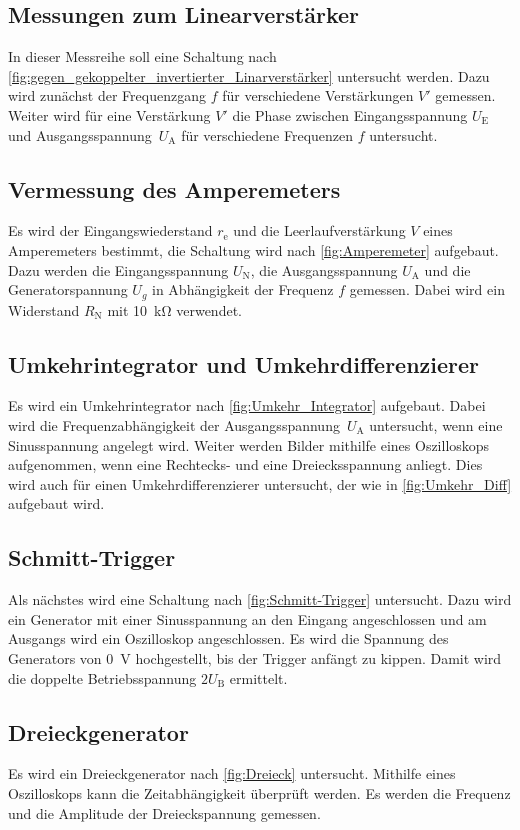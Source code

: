 \subsection{Messungen zum Linearverstärker}
In dieser Messreihe soll eine Schaltung nach \cref{fig:gegen_gekoppelter_invertierter_Linarverstärker} untersucht werden.
Dazu wird zunächst der Frequenzgang $f$ für verschiedene Verstärkungen $V'$ gemessen.
Weiter wird für eine Verstärkung $V'$ die Phase zwischen Eingangsspannung $U_\text{E}$ und Ausgangsspannung~$U_\text{A}$ für verschiedene Frequenzen $f$ untersucht.
\subsection{Vermessung des Amperemeters}
Es wird der Eingangswiederstand $r_\text{e}$ und die Leerlaufverstärkung $V$ eines Amperemeters bestimmt, die Schaltung wird nach \cref{fig:Amperemeter} aufgebaut.
Dazu werden die Eingangsspannung $U_\text{N}$, die Ausgangsspannung $U_\text{A}$ und die Generatorspannung $U_g$ in Abhängigkeit der Frequenz $f$ gemessen.
Dabei wird ein Widerstand $R_\text{N}$ mit \SI{10}{\kilo\ohm} verwendet.
\subsection{Umkehrintegrator und Umkehrdifferenzierer}
Es wird ein Umkehrintegrator nach \cref{fig:Umkehr_Integrator} aufgebaut.
Dabei wird die Frequenzabhängigkeit der Ausgangsspannung~$U_\text{A}$ untersucht, wenn eine Sinusspannung angelegt wird.
Weiter werden Bilder mithilfe eines Oszilloskops aufgenommen, wenn eine Rechtecks- und eine Dreiecksspannung anliegt.
Dies wird auch für einen Umkehrdifferenzierer untersucht, der wie in \cref{fig:Umkehr_Diff} aufgebaut wird.
\subsection{Schmitt-Trigger}
Als nächstes wird eine Schaltung nach \cref{fig:Schmitt-Trigger} untersucht.
Dazu wird ein Generator mit einer Sinusspannung an den Eingang angeschlossen und am Ausgangs wird ein Oszilloskop angeschlossen.
Es wird die Spannung des Generators von \SI{0}{\volt} hochgestellt, bis der Trigger anfängt zu kippen.
Damit wird die doppelte Betriebsspannung $2U_\text{B}$ ermittelt.
\subsection{Dreieckgenerator}
Es wird ein Dreieckgenerator nach \cref{fig:Dreieck} untersucht.
Mithilfe eines Oszilloskops kann die Zeitabhängigkeit überprüft werden.
Es werden die Frequenz und die Amplitude der Dreieckspannung gemessen.